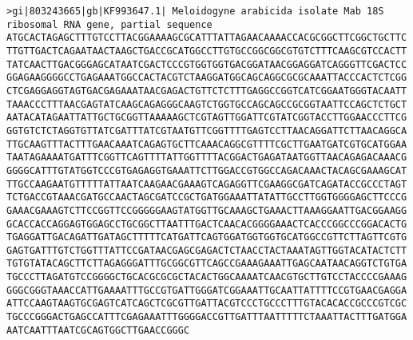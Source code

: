 \documentclass[11pt]{article}
\begin{document}
\begin{Verbatim}[commandchars=\\\{\}]
>gi|803243665|gb|KF993647.1| Meloidogyne arabicida isolate Mab 18S ribosomal RNA gene, partial sequence
ATGCACTAGAGCTTTGTCCTTACGGAAAAGCGCATTTATTAGAACAAAACCACGCGGCTTCGGCTGCTTC
TTGTTGACTCAGAATAACTAAGCTGACCGCATGGCCTTGTGCCGGCGGCGTGTCTTTCAAGCGTCCACTT
TATCAACTTGACGGGAGCATAATCGACTCCCGTGGTGGTGACGGATAACGGAGGATCAGGGTTCGACTCC
GGAGAAGGGGCCTGAGAAATGGCCACTACGTCTAAGGATGGCAGCAGGCGCGCAAATTACCCACTCTCGG
CTCGAGGAGGTAGTGACGAGAAATAACGAGACTGTTCTCTTTGAGGCCGGTCATCGGAATGGGTACAATT
TAAACCCTTTAACGAGTATCAAGCAGAGGGCAAGTCTGGTGCCAGCAGCCGCGGTAATTCCAGCTCTGCT
AATACATAGAATTATTGCTGCGGTTAAAAAGCTCGTAGTTGGATTCGTATCGGTACCTTGGAACCCTTCG
GGTGTCTCTAGGTGTTATCGATTTATCGTAATGTTCGGTTTTGAGTCCTTAACAGGATTCTTAACAGGCA
TTGCAAGTTTACTTTGAACAAATCAGAGTGCTTCAAACAGGCGTTTTCGCTTGAATGATCGTGCATGGAA
TAATAGAAAATGATTTCGGTTCAGTTTTATTGGTTTTACGGACTGAGATAATGGTTAACAGAGACAAACG
GGGGCATTTGTATGGTCCCGTGAGAGGTGAAATTCTTGGACCGTGGCCAGACAAACTACAGCGAAAGCAT
TTGCCAAGAATGTTTTTATTAATCAAGAACGAAAGTCAGAGGTTCGAAGGCGATCAGATACCGCCCTAGT
TCTGACCGTAAACGATGCCAACTAGCGATCCGCTGATGGAAATTATATTGCCTTGGTGGGGAGCTTCCCG
GAAACGAAAGTCTTCCGGTTCCGGGGGAAGTATGGTTGCAAAGCTGAAACTTAAAGGAATTGACGGAAGG
GCACCACCAGGAGTGGAGCCTGCGGCTTAATTTGACTCAACACGGGGAAACTCACCCGGCCCGGACACTG
TGAGGATTGACAGATTGATAGCTTTTTCATGATTCAGTGGATGGTGGTGCATGGCCGTTCTTAGTTCGTG
GAGTGATTTGTCTGGTTTATTCCGATAACGAGCGAGACTCTAACCTACTAAATAGTTGGTACATACTCTT
TGTGTATACAGCTTCTTAGAGGGATTTGCGGCGTTCAGCCGAAAGAAATTGAGCAATAACAGGTCTGTGA
TGCCCTTAGATGTCCGGGGCTGCACGCGCGCTACACTGGCAAAATCAACGTGCTTGTCCTACCCCGAAAG
GGGCGGGTAAACCATTGAAAATTTGCCGTGATTGGGATCGGAAATTGCAATTATTTTCCGTGAACGAGGA
ATTCCAAGTAAGTGCGAGTCATCAGCTCGCGTTGATTACGTCCCTGCCCTTTGTACACACCGCCCGTCGC
TGCCCGGGACTGAGCCATTTCGAGAAATTTGGGGACCGTTGATTTAATTTTTCTAAATTACTTTGATGGA
AATCAATTTAATCGCAGTGGCTTGAACCGGGC


\end{Verbatim}
\end{document}
